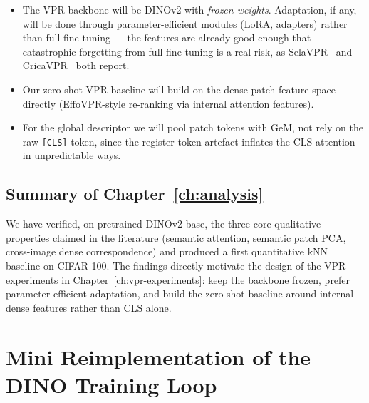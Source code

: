 \documentclass[11pt,a4paper]{article}
\begin{document}
\begin{itemize}[leftmargin=*]
  \item[(D1)] The VPR backbone will be DINOv2 with \emph{frozen weights}.
  Adaptation, if any, will be done through parameter-efficient modules
  (LoRA, adapters) rather than full fine-tuning --- the features are
  already good enough that catastrophic forgetting from full fine-tuning
  is a real risk, as SelaVPR~\citep{lu2024selavpr} and
  CricaVPR~\citep{lu2024cricavpr} both report.
  \item[(D2)] Our zero-shot VPR baseline will build on the dense-patch
  feature space directly (EffoVPR-style re-ranking via internal attention
  features).
  \item[(D3)] For the global descriptor we will pool patch tokens with GeM,
  not rely on the raw \texttt{[CLS]} token, since the register-token
  artefact inflates the CLS attention in unpredictable ways.
\end{itemize}

\subsection{Summary of Chapter~\ref{ch:analysis}}

We have verified, on pretrained DINOv2-base, the three core qualitative
properties claimed in the literature (semantic attention, semantic patch
PCA, cross-image dense correspondence) and produced a first quantitative
kNN baseline on CIFAR-100. The findings directly motivate the design of
the VPR experiments in Chapter~\ref{ch:vpr-experiments}: keep the backbone frozen, prefer
parameter-efficient adaptation, and build the zero-shot baseline around
internal dense features rather than CLS alone.

\newpage
\section{Mini Reimplementation of the DINO Training Loop}
\label{ch:mini}

\noindent{}
\vspace{1em}
\end{document}
